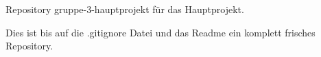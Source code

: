 Repository \textquotesingle{}gruppe-\/3-\/hauptprojekt\textquotesingle{} für das Hauptprojekt.

Dies ist bis auf die .gitignore Datei und das Readme ein komplett frisches Repository. 